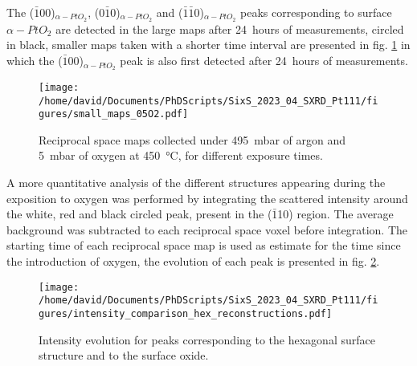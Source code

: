 The ($\bar{1}0$0)$_{\alpha-PtO_2}$, ($0\bar{1}$0)$_{\alpha-PtO_2}$ and ($\bar{1}\bar{1}$0)$_{\alpha-PtO_2}$ peaks corresponding to surface ${\alpha-PtO_2}$ are detected in the large maps after \qty{24}{hours} of measurements, circled in black, smaller maps taken with a shorter time interval are presented in fig. \ref{fig:SmallMapsPt111LowOxygen} in which the ($\bar{1}0$0)$_{\alpha-PtO_2}$ peak is also first detected after \qty{24}{hours} of measurements.

\begin{figure}[!htb]
    \centering
    \texttt{[image: /home/david/Documents/PhDScripts/SixS\_2023\_04\_SXRD\_Pt111/figures/small\_maps\_05O2.pdf]}
    \caption{
        Reciprocal space maps collected under \qty{495}{\milli\bar} of argon and \qty{5}{\milli\bar} of oxygen at \qty{450}{\degreeCelsius}, for different exposure times.
    }
    \label{fig:SmallMapsPt111LowOxygen}
\end{figure}

A more quantitative analysis of the different structures appearing during the exposition to oxygen was performed by integrating the scattered intensity around the white, red and black circled peak, present in the ($\bar{1}$10) region.
The average background was subtracted to each reciprocal space voxel before integration.
The starting time of each reciprocal space map is used as estimate for the time since the introduction of oxygen, the evolution of each peak is presented in fig. \ref{fig:HexBraggPeaks}.

\begin{figure}[!htb]
    \centering
    \texttt{[image: /home/david/Documents/PhDScripts/SixS\_2023\_04\_SXRD\_Pt111/figures/intensity\_comparison\_hex\_reconstructions.pdf]}
    \caption{
        Intensity evolution for peaks corresponding to the hexagonal surface structure and to the surface oxide.
    }
    \label{fig:HexBraggPeaks}
\end{figure}

